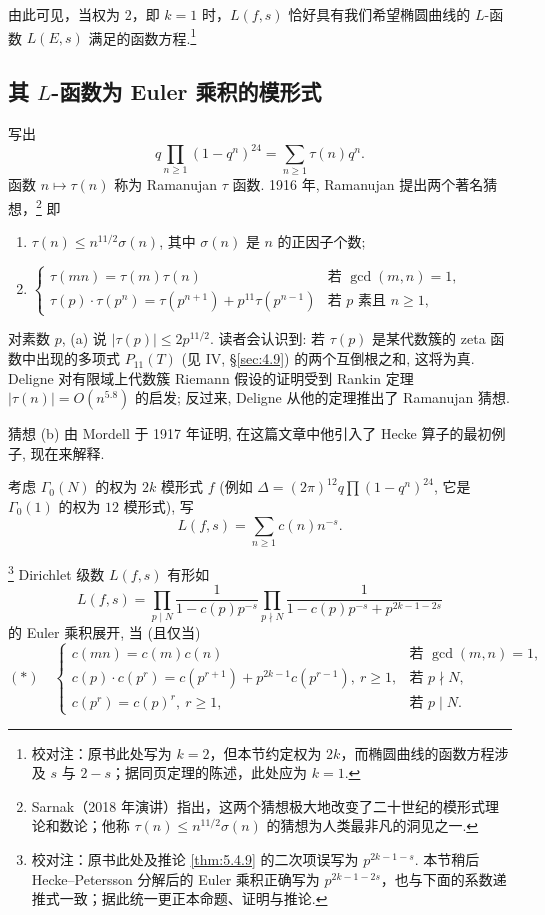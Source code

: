 由此可见，当权为 $2$，即 $k=1$ 时，$L(f,s)$ 恰好具有我们希望椭圆曲线的 $L$-函数 $L(E,s)$ 满足的函数方程.\footnote{校对注：原书此处写为 $k=2$，但本节约定权为 $2k$，而椭圆曲线的函数方程涉及 $s$ 与 $2-s$；据同页定理的陈述，此处应为 $k=1$.}

\subsection*{其 $L$-函数为 Euler 乘积的模形式}

写出
\[
q\prod_{n\ge 1}(1-q^n)^{24} = \sum_{n\ge 1}\tau(n)q^n.
\]
函数 $n\mapsto\tau(n)$ 称为 Ramanujan $\tau$ 函数. 1916 年, Ramanujan 提出两个著名猜想，\footnote{Sarnak（2018 年演讲）指出，这两个猜想极大地改变了二十世纪的模形式理论和数论；他称 $\tau(n)\le n^{11/2}\sigma(n)$ 的猜想为人类最非凡的洞见之一.} 即
    \begin{enumerate}[label=\textup{(\alph*)}]
    \item $\tau(n)\le n^{11/2}\sigma(n)$, 其中 $\sigma(n)$ 是 $n$ 的正因子个数;
    \item $\begin{cases}
    \tau(mn) = \tau(m)\tau(n) & \text{若 } \gcd(m, n) = 1,\\
    \tau(p)\cdot\tau(p^n) = \tau(p^{n+1}) + p^{11}\tau(p^{n-1}) & \text{若 } p \text{ 素且 } n\ge 1,
    \end{cases}$
\end{enumerate}

对素数 $p$, (a) 说 $|\tau(p)|\le 2p^{11/2}$. 读者会认识到: 若 $\tau(p)$ 是某代数簇的 zeta 函数中出现的多项式 $P_{11}(T)$ (见 IV, \S\ref{sec:4.9}) 的两个互倒根之和, 这将为真. Deligne 对有限域上代数簇 Riemann 假设的证明受到 Rankin 定理 $|\tau(n)| = O(n^{5.8})$ 的启发; 反过来, Deligne 从他的定理推出了 Ramanujan 猜想.

猜想 (b) 由 Mordell 于 1917 年证明, 在这篇文章中他引入了 Hecke 算子的最初例子, 现在来解释.

考虑 $\Gamma_0(N)$ 的权为 $2k$ 模形式 $f$ (例如 $\Delta = (2\pi)^{12}q\prod(1-q^n)^{24}$, 它是 $\Gamma_0(1)$ 的权为 $12$ 模形式), 写
\[
L(f, s) = \sum_{n\ge 1}c(n)n^{-s}.
\]

\begin{proposition} \label{thm:5.4.5}
\footnote{校对注：原书此处及推论 \ref{thm:5.4.9} 的二次项误写为 $p^{2k-1-s}$. 本节稍后 Hecke--Petersson 分解后的 Euler 乘积正确写为 $p^{2k-1-2s}$，也与下面的系数递推式一致；据此统一更正本命题、证明与推论.}
Dirichlet 级数 $L(f, s)$ 有形如
\[
L(f, s) = \prod_{p\mid N}\frac{1}{1-c(p)p^{-s}}\prod_{p\nmid N}\frac{1}{1-c(p)p^{-s} + p^{2k-1-2s}}
\]
的 Euler 乘积展开, 当 (且仅当)
\[
(*)\quad
\begin{cases}
c(mn) = c(m)c(n) & \text{若 } \gcd(m, n) = 1,\\
c(p)\cdot c(p^r) = c(p^{r+1}) + p^{2k-1}c(p^{r-1}), \ r\ge 1, & \text{若 } p\nmid N,\\
c(p^r) = c(p)^r, \ r\ge 1, & \text{若 } p\mid N.
\end{cases}
\]
\end{proposition}

